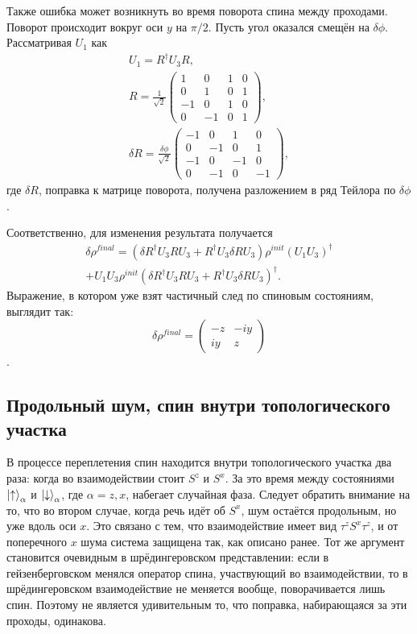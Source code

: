 \documentclass[a4paper,12pt]{article}
\theoremstyle{plain} %
\theoremstyle{definition} %
\theoremstyle{remark} %
\begin{document}
Также ошибка может возникнуть во время поворота спина между проходами. Поворот происходит вокруг оси $y$ на $\pi/2$. Пусть угол оказался смещён на $\delta \phi$. Рассматривая $U_1$ как
\begin{gather}
    U_1 = R^\dagger U_3 R,
    \\
    R = \frac{1}{\sqrt{2}}
    \begin{pmatrix}
        1 & 0 & 1 & 0 \\
        0 & 1 & 0 & 1 \\
        -1 & 0 & 1 & 0 \\
        0 & -1 & 0 & 1
    \end{pmatrix},
    \\
    \delta R = \frac{\delta \phi}{\sqrt{2}}
    \begin{pmatrix}
        -1 & 0 & 1 & 0 \\
        0 & -1 & 0 & 1 \\
        -1 & 0 & -1 & 0 \\
        0 & -1 & 0 & -1
    \end{pmatrix},
\end{gather}
где $\delta R$, поправка к матрице поворота, получена разложением в ряд Тейлора по $\delta \phi$.

Соответственно, для изменения результата получается
\begin{multline}
    \delta \rho^{final} = \left( \delta R^\dagger U_3 R U_3 + R^\dagger U_3 \delta R U_3 \right) \rho^{init} (U_1 U_3)^\dagger \\
    + U_1 U_3 \rho^{init} \left( \delta R^\dagger U_3 R U_3 + R^\dagger U_3 \delta R U_3 \right)^\dagger.
\end{multline}
Выражение, в котором уже взят частичный след по спиновым состояниям, выглядит так:
\begin{equation}
    \delta \rho^{final} = 
    \begin{pmatrix}
        -z & - i y \\
        i y & z
    \end{pmatrix}
\end{equation}.

\subsection{Продольный шум, спин внутри топологического участка}

В процессе переплетения спин находится внутри топологического участка два раза: когда во взаимодействии стоит $S^z$ и $S^x$.
За это время между состояниями $\ket{\uparrow}_\alpha$ и $\ket{\downarrow}_\alpha$, где $\alpha = z, x$, набегает случайная фаза.
Следует обратить внимание на то, что во втором случае, когда речь идёт об $S^x$, шум остаётся продольным, но уже вдоль оси $x$. 
Это связано с тем, что взаимодействие имеет вид $\tau^z S^x \tau^z$, и от поперечного $x$ шума система защищена так, как описано ранее. 
Тот же аргумент становится очевидным в шрёдингеровском представлении: если в гейзенберговском менялся оператор спина, участвующий во взаимодействии, то в шрёдингеровском взаимодействие не меняется вообще, поворачивается лишь спин.
Поэтому не является удивительным то, что поправка, набирающаяся за эти проходы, одинакова.
\end{document}
